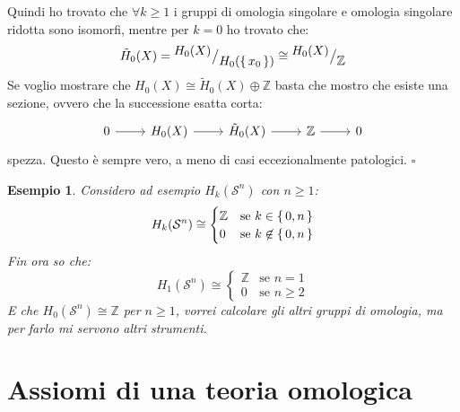 \documentclass[10pt, twoside=false, x11names]{scrbook}
\newtheorem{example}[theorem]{Esempio}
\newenvironment{proof}{{\textbf{Dimostrazione}:}}{\hfill $\square$}
\newcommand{\Z}{\mathbb{Z}}
\newcommand{\Sph}[1][]{\mathcal{S}^#1}
\newcommand*\quot[2]{{^{\textstyle #1}\big/_{\textstyle #2}}}
\begin{document}
\begin{proof}
  Quindi ho trovato che $ \forall k \geq 1 $ i gruppi di omologia singolare e omologia singolare ridotta
  sono isomorfi, mentre per $ k = 0 $ ho trovato che:
  \[
    \tilde{H}_0(X) = \quot{H_0(X)}{H_0(\set{x_0})} \cong  \quot{H_0(X)}{\Z}
  \]
  Se voglio mostrare che $ H_0(X) \cong \tilde{H}_0(X) \oplus \Z $ basta che mostro che esiste una sezione,
  ovvero che la successione esatta corta:
  \[
    \begin{tikzcd}
      0 \rar & H_0(X) \rar & \tilde{H}_0(X) \rar & \Z \rar & 0
    \end{tikzcd}
  \]
  spezza. Questo è sempre vero, a meno di casi eccezionalmente patologici.
\end{proof}

\begin{example}
  Considero ad esempio $ H_k(\Sph{n}) $ con $ n \geq 1 $:
  \[
    H_k(\Sph{n}) \cong
    \begin{cases}
      \Z & \text{se } k \in \set{0,n} \\
      0 & \text{se } k \not \in \set{0,n}
    \end{cases}
  \]
  Fin ora so che:
  \[
    H_1(\Sph{n}) \cong
    \begin{cases}
      \Z & \text{se } n = 1 \\
      0 & \text{se } n \geq 2
    \end{cases}
  \]
  E che $ H_0(\Sph{n}) \cong \Z $ per $ n \geq 1 $, vorrei calcolare gli altri gruppi di omologia,
  ma per farlo mi servono altri strumenti.
\end{example}

\section{Assiomi di una teoria omologica}
\end{document}
